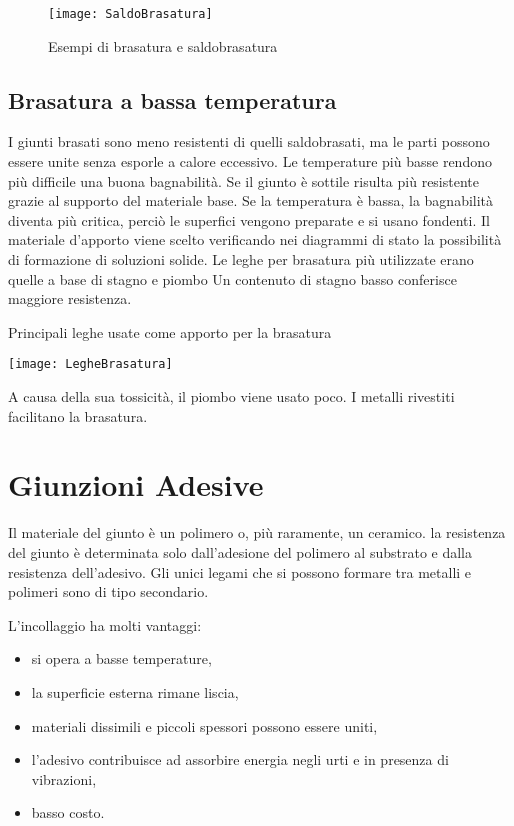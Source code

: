 \begin{figure}
\centering
\texttt{[image: SaldoBrasatura]}
\caption{Esempi di brasatura e saldobrasatura}
\label{fig:SaldoBrasatura}
\end{figure}

\subsection{Brasatura a bassa temperatura}
I giunti brasati sono meno resistenti di quelli saldobrasati, ma le parti possono essere unite senza esporle a calore eccessivo.
Le temperature più basse rendono più difficile una buona bagnabilità.
Se il giunto è sottile risulta più resistente grazie al supporto del materiale base.
Se la temperatura è bassa, la bagnabilità diventa più critica, perciò le superfici vengono preparate e si usano fondenti.
Il materiale d'apporto viene scelto verificando nei diagrammi di stato la possibilità di formazione di soluzioni solide.
Le leghe per brasatura più utilizzate erano quelle a base di stagno e piombo
Un contenuto di stagno basso conferisce maggiore resistenza.

\begin{table}
\centering
\caption{Principali leghe usate come apporto per la brasatura}
\label{tab:LegheBrasatura}
\texttt{[image: LegheBrasatura]}
\end{table}

A causa della sua tossicità, il piombo viene usato poco.
I metalli rivestiti facilitano la brasatura.

\section{Giunzioni Adesive}
Il materiale del giunto è un polimero o, più raramente, un ceramico.
la resistenza del giunto è determinata solo dall'adesione del polimero al substrato e dalla resistenza dell'adesivo.
Gli unici legami che si possono formare tra metalli e polimeri sono di tipo secondario.

L'incollaggio ha molti vantaggi:
\begin{itemize}
\item si opera a basse temperature,
\item la superficie esterna rimane liscia,
\item materiali dissimili e piccoli spessori possono essere uniti,
\item  l'adesivo contribuisce ad assorbire energia negli urti e in presenza di vibrazioni,
\item basso costo.
\end{itemize}

